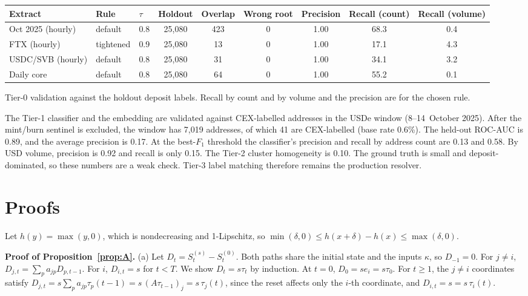 \documentclass[referee,pdflatex,sn-mathphys-ay]{sn-jnl}
\newcommand{\fitbox}{\ifdim\wd\tabbox>\linewidth\resizebox{\linewidth}{!}{\usebox{\tabbox}}\else\usebox{\tabbox}\fi}%
\theoremstyle{thmstyleone}%
\theoremstyle{thmstyletwo}%
\theoremstyle{thmstylethree}%
\begin{document}
\begin{appendices}
\begin{lrbox}{\tabbox}\footnotesize\setlength{\tabcolsep}{3pt}%
\begin{tabular}{@{}lllcccccc@{}}
\toprule
\textbf{Extract} & \textbf{Rule} & \textbf{$\tau$} & \textbf{Holdout} & \textbf{Overlap} & \textbf{Wrong root} & \textbf{Precision} & \textbf{Recall (count)} & \textbf{Recall (volume)}\\
\midrule
Oct 2025 (hourly) & default & 0.8 & 25{,}080 & 423 & 0 & 1.00 & 68.3 & 0.4 \\
FTX (hourly) & tightened & 0.9 & 25{,}080 & 13 & 0 & 1.00 & 17.1 & 4.3 \\
USDC/SVB (hourly) & default & 0.8 & 25{,}080 & 31 & 0 & 1.00 & 34.1 & 3.2 \\
Daily core & default & 0.8 & 25{,}080 & 64 & 0 & 1.00 & 55.2 & 0.1 \\
\bottomrule
\end{tabular}
\end{lrbox}
\begin{tableorg}[tbp]
\centering
\caption{Tier-0 validation against the holdout deposit labels. Recall by count and by volume and the precision are for the chosen rule.}
\label{tab:tier0}
\fitbox
\end{tableorg}

The Tier-1 classifier and the embedding are validated against CEX-labelled addresses in the USDe window
(8--14~October 2025). After the mint/burn sentinel is excluded, the window has 7{,}019 addresses, of which 41 are CEX-labelled
(base rate 0.6\%). The held-out ROC-AUC is 0.89, and the average precision is 0.17. At the best-$F_1$
threshold the classifier's precision and recall by address count are 0.13 and 0.58. By USD volume, precision is
0.92 and recall is only 0.15. The Tier-2 cluster homogeneity is 0.10.
The ground truth is small and deposit-dominated, so these numbers are a weak check. Tier-3 label matching therefore remains the
production resolver.

\section{Proofs}\label{app:proofs}

Let $h(y)=\max(y,0)$, which is nondecreasing and 1-Lipschitz, so $\min(\delta,0)\le h(x+\delta)-h(x)\le\max(\delta,0)$.

\noindent\textbf{Proof of Proposition~\ref{prop:A}.} (a) Let $D_t=S^{(s)}_t-S^{(0)}_t$.
Both paths share the initial state and the inputs $\kappa$, so $D_{-1}=0$. For $j\neq i$,
$D_{j,t}=\sum_p a_{jp}D_{p,t-1}$. For $i$, $D_{i,t}=s$ for $t<T$. We show $D_t=s\tau_t$ by
induction. At $t=0$, $D_0=se_i=s\tau_0$. For $t\ge1$, the $j\neq i$ coordinates satisfy
$D_{j,t}=s\sum_pa_{jp}\tau_{p}(t-1)=s\,(A\tau_{t-1})_j=s\,\tau_j(t)$, since the reset
affects only the $i$-th coordinate, and $D_{i,t}=s=s\,\tau_i(t)$.


\end{appendices}
\end{document}
